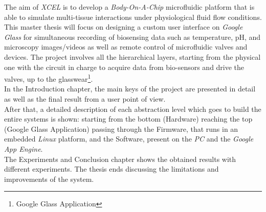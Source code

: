 The aim of \textit{XCEL} is to develop a \textit{Body-On-A-Chip} microfluidic platform that is able to simulate multi-tissue interactions under physiological fluid flow conditions.\\

This master thesis will focus on designing a custom user interface on \textit{Google Glass} for simultaneous recording of biosensing data such as temperature, pH, and microscopy images/videos as well as remote control of microfluidic valves and devices.  The project involves all the hierarchical layers, starting from the physical one with the circuit in charge to acquire data from bio-sensors and drive the valves, up to the glasswear\footnote{Google Glass Application}.\\

In the Introduction chapter, the main keys of the project are presented in detail as well as the final result from a user point of view.\\
After that, a detailed description of each abstraction level which goes to build the entire systems is shown: starting from the bottom (Hardware) reaching the top (Google Glass Application) passing through the Firmware, that runs in an embedded \textit{Linux} platform, and the Software, present on the \textit{PC} and the \textit{Google App Engine}.\\
The  Experiments and Conclusion chapter shows the obtained results with different experiments. The thesis ends discussing the limitations and improvements of the system.
